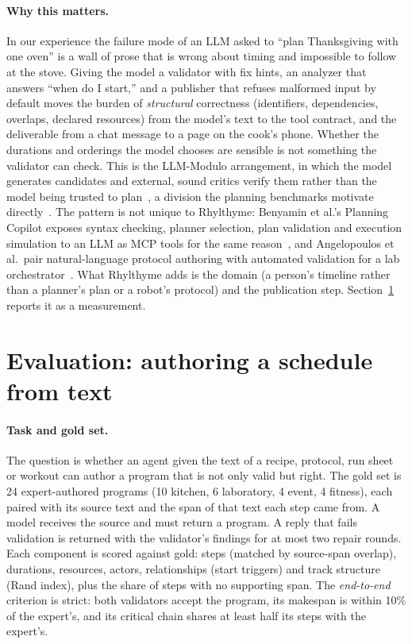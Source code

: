 \documentclass[10pt]{article}
\newcommand{\rt}{Rhylthyme}
\begin{document}
\paragraph{Why this matters.} In our experience the failure mode of an LLM asked to ``plan Thanksgiving with one oven'' is a wall of prose that is wrong about timing and impossible to follow at the stove. Giving the model a validator with fix hints, an analyzer that answers ``when do I start,'' and a publisher that refuses malformed input by default moves the burden of \emph{structural} correctness (identifiers, dependencies, overlaps, declared resources) from the model's text to the tool contract, and the deliverable from a chat message to a page on the cook's phone. Whether the durations and orderings the model chooses are sensible is not something the validator can check. This is the LLM-Modulo arrangement, in which the model generates candidates and external, sound critics verify them rather than the model being trusted to plan~\cite{kambhampati2024llmmodulo}, a division the planning benchmarks motivate directly~\cite{valmeekam2023planbench}. The pattern is not unique to \rt{}: Benyamin et al.'s Planning Copilot exposes syntax checking, planner selection, plan validation and execution simulation to an LLM as MCP tools for the same reason~\cite{benyamin2025copilot}, and Angelopoulos et al.\ pair natural-language protocol authoring with automated validation for a lab orchestrator~\cite{angelopoulos2026prompts}. What \rt{} adds is the domain (a person's timeline rather than a planner's plan or a robot's protocol) and the publication step. Section~\ref{sec:eval} reports it as a measurement.

\section{Evaluation: authoring a schedule from text}
\label{sec:eval}

\paragraph{Task and gold set.} The question is whether an agent given the text of a recipe, protocol, run sheet or workout can author a program that is not only valid but right. The gold set is 24 expert-authored programs (10 kitchen, 6 laboratory, 4 event, 4 fitness), each paired with its source text and the span of that text each step came from. A model receives the source and must return a program. A reply that fails validation is returned with the validator's findings for at most two repair rounds. Each component is scored against gold: steps (matched by source-span overlap), durations, resources, actors, relationships (start triggers) and track structure (Rand index), plus the share of steps with no supporting span. The \emph{end-to-end} criterion is strict: both validators accept the program, its makespan is within 10\% of the expert's, and its critical chain shares at least half its steps with the expert's.
\end{document}
